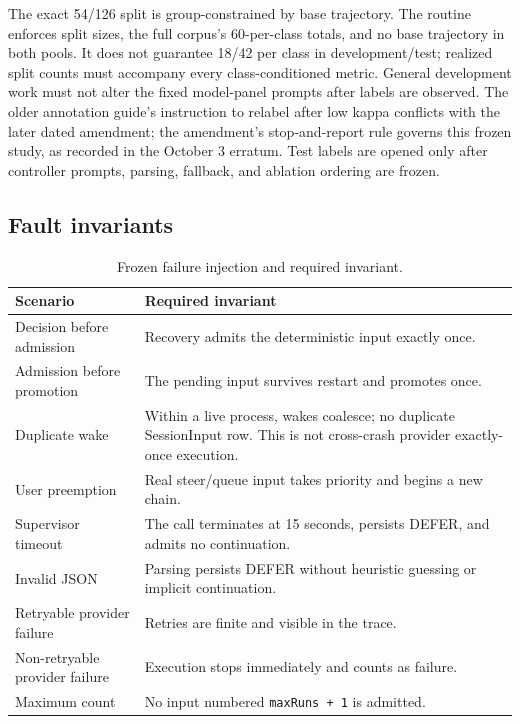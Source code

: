 The exact 54/126 split is group-constrained by base trajectory. The routine enforces split sizes, the full corpus's 60-per-class totals, and no base trajectory in both pools. It does not guarantee 18/42 per class in development/test; realized split counts must accompany every class-conditioned metric. General development work must not alter the fixed model-panel prompts after labels are observed. The older annotation guide's instruction to relabel after low kappa conflicts with the later dated amendment; the amendment's stop-and-report rule governs this frozen study, as recorded in the October 3 erratum. Test labels are opened only after controller prompts, parsing, fallback, and ablation ordering are frozen.

\subsection{Fault invariants}

\begin{table}[t]
  \caption{Frozen failure injection and required invariant.}
  \centering
  \begin{tabular}{p{}p{}}
    \toprule
    Scenario & Required invariant \\
    \midrule
    Decision before admission & Recovery admits the deterministic input exactly once. \\
    Admission before promotion & The pending input survives restart and promotes once. \\
    Duplicate wake & Within a live process, wakes coalesce; no duplicate SessionInput row. This is not cross-crash provider exactly-once execution. \\
    User preemption & Real steer/queue input takes priority and begins a new chain. \\
    Supervisor timeout & The call terminates at 15 seconds, persists DEFER, and admits no continuation. \\
    Invalid JSON & Parsing persists DEFER without heuristic guessing or implicit continuation. \\
    Retryable provider failure & Retries are finite and visible in the trace. \\
    Non-retryable provider failure & Execution stops immediately and counts as failure. \\
    Maximum count & No input numbered \texttt{maxRuns + 1} is admitted. \\
    \bottomrule
  \end{tabular}
\end{table}

